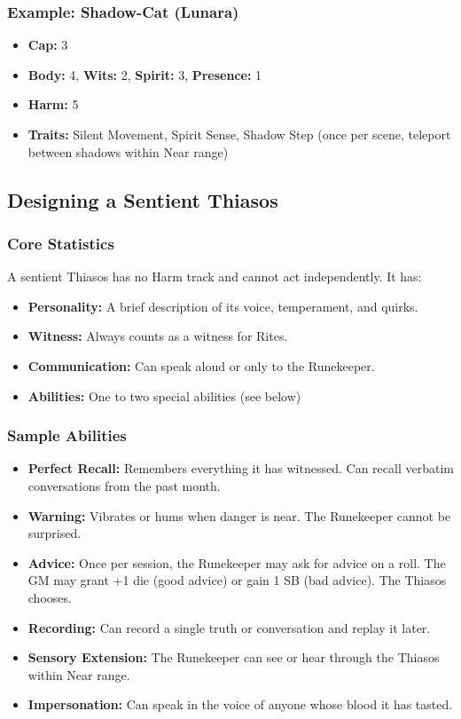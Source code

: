\subsubsection{Example: Shadow-Cat (Lunara)}

\begin{itemize}
\item \textbf{Cap:} 3
\item \textbf{Body:} 4, \textbf{Wits:} 2, \textbf{Spirit:} 3, \textbf{Presence:} 1
\item \textbf{Harm:} 5
\item \textbf{Traits:} Silent Movement, Spirit Sense, Shadow Step (once per scene, teleport between shadows within Near range)
\end{itemize}

\subsection{Designing a Sentient Thiasos}

\subsubsection{Core Statistics}

A sentient Thiasos has no Harm track and cannot act independently. It has:

\begin{itemize}
\item \textbf{Personality:} A brief description of its voice, temperament, and quirks.
\item \textbf{Witness:} Always counts as a witness for Rites.
\item \textbf{Communication:} Can speak aloud or only to the Runekeeper.
\item \textbf{Abilities:} One to two special abilities (see below)
\end{itemize}

\subsubsection{Sample Abilities}

\begin{itemize}
\item \textbf{Perfect Recall:} Remembers everything it has witnessed. Can recall verbatim conversations from the past month.
\item \textbf{Warning:} Vibrates or hums when danger is near. The Runekeeper cannot be surprised.
\item \textbf{Advice:} Once per session, the Runekeeper may ask for advice on a roll. The GM may grant +1 die (good advice) or gain 1 SB (bad advice). The Thiasos chooses.
\item \textbf{Recording:} Can record a single truth or conversation and replay it later.
\item \textbf{Sensory Extension:} The Runekeeper can see or hear through the Thiasos within Near range.
\item \textbf{Impersonation:} Can speak in the voice of anyone whose blood it has tasted.
\end{itemize}


